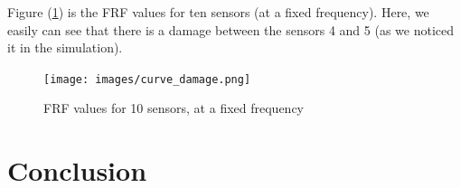 \documentclass[journal]{IEEEtran}
\begin{document}
Figure (\ref{damage}) is the FRF values for ten sensors (at a fixed frequency). Here, we easily can see that there is a damage between the sensors 4 and 5 (as we noticed it in the simulation).

\begin{figure}
  \centering
  \texttt{[image: images/curve\_damage.png]}
  \caption{FRF values for 10 sensors, at a fixed frequency}
  \label{damage}
\end{figure}


\section{Conclusion}







%
%

\nocite{*}
\printbibliography
\end{document}
